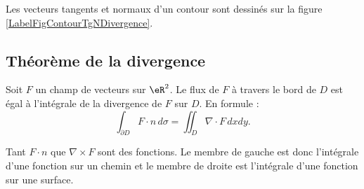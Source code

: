 Les vecteurs tangents et normaux d'un contour sont dessinés sur la figure \ref{LabelFigContourTgNDivergence}.
\newcommand{\CaptionFigContourTgNDivergence}{Le champ de vecteurs tangents est dessiné en rouge tandis qu'en vert nous avons le champ de vecteurs normaux extérieurs.}


\subsection{Théorème de la divergence}

\begin{theorem}
    Soit $F$ un champ de vecteurs sur $\eR^2$. Le flux de $F$ à travers le bord de $D$ est égal à l'intégrale de la divergence de $F$ sur $D$. En formule :
    \begin{equation}
        \int_{\partial D} F\cdot n\,d\sigma=\iint_D\nabla\cdot F\,dxdy.
    \end{equation}
\end{theorem}

\begin{remark}
    Tant $F\cdot n$ que $\nabla\times F$ sont des fonctions. Le membre de gauche est donc l'intégrale d'une fonction sur un chemin et le membre de droite est l'intégrale d'une fonction sur une surface.
\end{remark}

